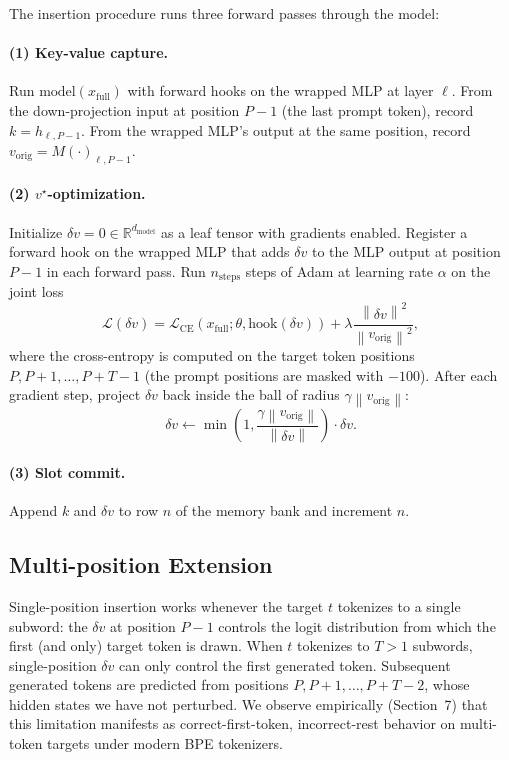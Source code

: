 \documentclass[11pt,a4paper]{article}
\newcommand{\R}{\mathbb{R}}
\newcommand{\norm}[1]{\left\|#1\right\|}
\begin{document}
The insertion procedure runs three forward passes through the model:

\paragraph{(1) Key-value capture.} Run $\text{model}(x_\text{full})$ with
forward hooks on the wrapped MLP at layer $\ell$. From the down-projection
input at position $P-1$ (the last prompt token), record
$k = h_{\ell, P-1}$. From the wrapped MLP's output at the same position,
record $v_\text{orig} = M(\cdot)_{\ell, P-1}$.

\paragraph{(2) $v^\star$-optimization.} Initialize $\delta v = 0 \in
\R^{d_\text{model}}$ as a leaf tensor with gradients enabled. Register a
forward hook on the wrapped MLP that adds $\delta v$ to the MLP output
at position $P-1$ in each forward pass. Run $n_\text{steps}$ steps of
Adam at learning rate $\alpha$ on the joint loss
\begin{equation}
\mathcal{L}(\delta v) = \mathcal{L}_\text{CE}(x_\text{full}; \theta, \text{hook}(\delta v)) + \lambda \frac{\norm{\delta v}^2}{\norm{v_\text{orig}}^2},
\end{equation}
where the cross-entropy is computed on the target token positions
$P, P+1, \ldots, P+T-1$ (the prompt positions are masked with $-100$).
After each gradient step, project $\delta v$ back inside the ball of
radius $\gamma \norm{v_\text{orig}}$:
\begin{equation}
\delta v \leftarrow \min\left(1, \frac{\gamma \norm{v_\text{orig}}}{\norm{\delta v}}\right) \cdot \delta v.
\end{equation}

\paragraph{(3) Slot commit.} Append $k$ and $\delta v$ to row $n$ of the
memory bank and increment $n$.

\subsection{Multi-position Extension}

Single-position insertion works whenever the target $t$ tokenizes to a
single subword: the $\delta v$ at position $P-1$ controls the logit
distribution from which the first (and only) target token is drawn.
When $t$ tokenizes to $T > 1$ subwords, single-position $\delta v$ can
only control the first generated token. Subsequent generated tokens are
predicted from positions $P, P+1, \ldots, P+T-2$, whose hidden states we
have not perturbed. We observe empirically (Section~7) that this
limitation manifests as correct-first-token, incorrect-rest behavior on
multi-token targets under modern BPE tokenizers.
\end{document}

